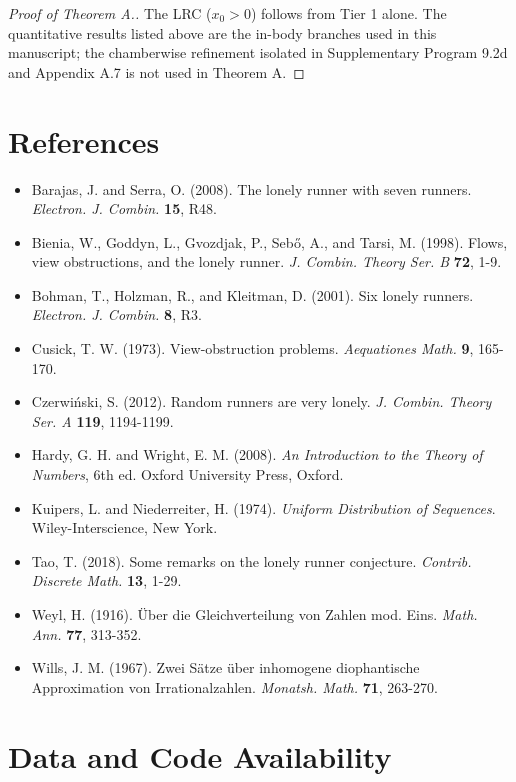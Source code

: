 \documentclass[11pt,a4paper]{article}
\theoremstyle{plain}
\theoremstyle{definition}
\theoremstyle{remark}
\begin{document}
\begin{proof}[Proof of Theorem A.]
The LRC ($x_0 > 0$) follows from Tier 1 alone. The quantitative results listed above are the in-body branches used in this manuscript; the chamberwise refinement isolated in Supplementary Program 9.2d and Appendix A.7 is not used in Theorem A.
\end{proof}


\medskip



\section{References}


\begin{itemize}
\item Barajas, J. and Serra, O. (2008). The lonely runner with seven runners. \textit{Electron. J. Combin.} \textbf{15}, R48.
\item Bienia, W., Goddyn, L., Gvozdjak, P., Sebő, A., and Tarsi, M. (1998). Flows, view obstructions, and the lonely runner. \textit{J. Combin. Theory Ser. B} \textbf{72}, 1-9.
\item Bohman, T., Holzman, R., and Kleitman, D. (2001). Six lonely runners. \textit{Electron. J. Combin.} \textbf{8}, R3.
\item Cusick, T. W. (1973). View-obstruction problems. \textit{Aequationes Math.} \textbf{9}, 165-170.
\item Czerwiński, S. (2012). Random runners are very lonely. \textit{J. Combin. Theory Ser. A} \textbf{119}, 1194-1199.
\item Hardy, G. H. and Wright, E. M. (2008). \textit{An Introduction to the Theory of Numbers}, 6th ed. Oxford University Press, Oxford.
\item Kuipers, L. and Niederreiter, H. (1974). \textit{Uniform Distribution of Sequences}. Wiley-Interscience, New York.
\item Tao, T. (2018). Some remarks on the lonely runner conjecture. \textit{Contrib. Discrete Math.} \textbf{13}, 1-29.
\item Weyl, H. (1916). Über die Gleichverteilung von Zahlen mod. Eins. \textit{Math. Ann.} \textbf{77}, 313-352.
\item Wills, J. M. (1967). Zwei Sätze über inhomogene diophantische Approximation von Irrationalzahlen. \textit{Monatsh. Math.} \textbf{71}, 263-270.
\end{itemize}


\medskip



\section{Data and Code Availability}
\end{document}
